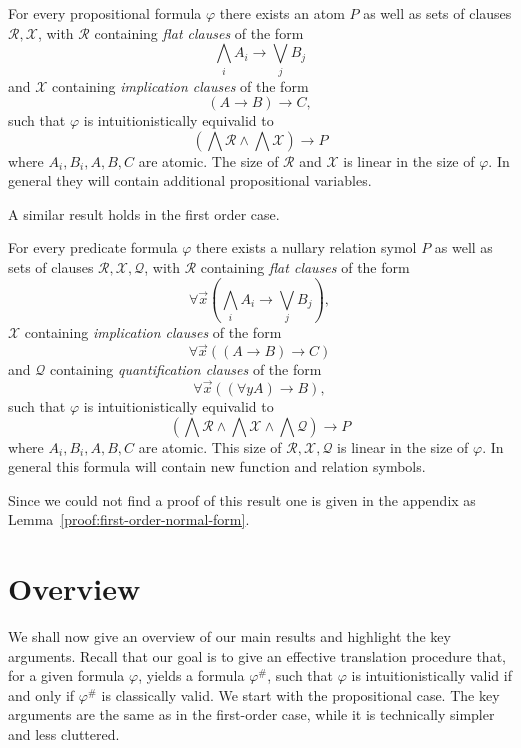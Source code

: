 \documentclass[runningheads]{llncs}
\begin{document}
\begin{lemma}\label{lemma:propositional-normal-form}
	For every propositional formula $\varphi$ there exists an atom $P$ as well as sets of clauses $\mathcal R, \mathcal X$, with $\mathcal R$ containing  \emph{flat clauses} of the form
	$$\bigwedge_iA_i\to\bigvee_jB_j$$
	and $\mathcal X$ containing \emph{implication clauses} of the form
	$$(A\to B)\to C,$$
	such that $\varphi$ is intuitionistically equivalid to
	$$\left(\bigwedge\mathcal R\wedge\bigwedge\mathcal X\right)\to P$$where $A_i, B_i, A, B, C$ are atomic. The size of $\mathcal R$ and $\mathcal X$ is linear in the size of $\varphi$. In general they will contain additional propositional variables.
\end{lemma}

A similar result holds in the first order case.

\begin{lemma}\label{lemma:first-order-normal-form}
	For every predicate formula $\varphi$ there exists a nullary relation symol $P$ as well as sets of clauses $\mathcal R,\mathcal X, \mathcal Q$, with $\mathcal R$ containing \emph{flat clauses} of the form
	$$\forall \vec x\left(\bigwedge_i A_i\to \bigvee_jB_j\right),$$
	$\mathcal X$ containing \emph{implication clauses} of the form
	$$\forall \vec x\left((A\to B)\to C\right)$$
	and $\mathcal Q$ containing \emph{quantification clauses} of the form
	$$\forall\vec x\left((\forall y A)\to B\right),$$
	such that $\varphi$ is intuitionistically equivalid to
	$$\left(\bigwedge\mathcal R\wedge\bigwedge \mathcal X\wedge\bigwedge\mathcal Q\right)\to P$$where $A_i, B_i, A, B, C$ are atomic. This size of $\mathcal R, \mathcal X, \mathcal Q$ is linear in the size of $\varphi$. In general this formula will contain new function and relation symbols.
\end{lemma}

Since we could not find a proof of this result one is given in the appendix as Lemma~\ref{proof:first-order-normal-form}.

\section{Overview}

We shall now give an overview of our main results and highlight the key arguments. Recall that our goal is to give an effective translation procedure that, for a given formula $\varphi$, yields a formula $\varphi^\#$, such that $\varphi$ is intuitionistically valid if and only if $\varphi^\#$ is classically valid. We start with the propositional case. The key arguments are the same as in the first-order case, while it is technically simpler and less cluttered.
\end{document}
